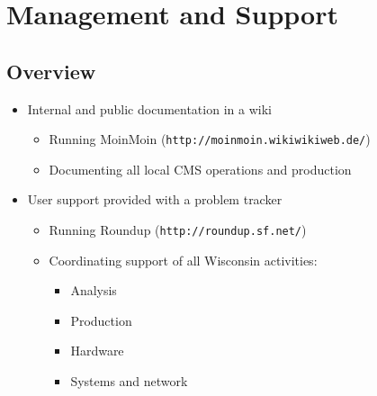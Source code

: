 \documentclass{beamer}
\begin{document}

\section{Management and Support}
\subsection{Overview}
\begin{frame}
\begin{itemize}
    \item Internal and public documentation in a wiki
    \begin{itemize}
        \item Running MoinMoin ({\tt http://moinmoin.wikiwikiweb.de/})
        \item Documenting all local CMS operations and production
    \end{itemize}
    \item User support provided with a problem tracker
    \begin{itemize}
        \item Running Roundup ({\tt http://roundup.sf.net/})
        \item Coordinating support of all Wisconsin activities:
        \begin{itemize}
            \item Analysis
            \item Production
            \item Hardware
            \item Systems and network
        \end{itemize}
    \end{itemize}
\end{itemize}
\end{frame}
\end{document}
